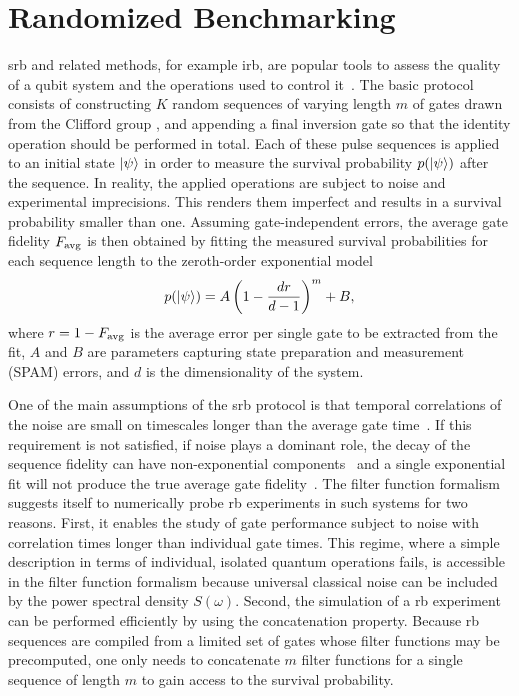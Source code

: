 \section{Randomized Benchmarking}\label{sec:ff:examples:randomized_benchmarking}
\Gls{srb} and related methods, for example \gls{irb}, are popular tools to assess the quality of a qubit system and the operations used to control it~\cite{Knill2008,Magesan2011,Magesan2012a}.
The basic protocol consists of constructing $K$ random sequences of varying length $m$ of gates drawn from the Clifford group
,
and appending a final inversion gate so that the identity operation should be performed in total.
Each of these pulse sequences is applied to an initial state $\mbox{\ensuremath{\ket{\psi}}}$ in order to measure the survival probability $p(\mbox{\ensuremath{\ket{\psi}}})$ after the sequence.
In reality, the applied operations are subject to noise and experimental imprecisions.
This renders them imperfect and results in a survival probability smaller than one.
Assuming gate-independent errors, the average gate fidelity $F_{\mathrm{avg}}$ is then obtained by fitting the measured survival probabilities for each sequence length to the zeroth-order exponential model~\cite{Magesan2011}
\begin{equation}\label{eq:ff:SRB}
    p(\mbox{\ensuremath{\ket{\psi}}}) = A \left(1 - \frac{dr}{d-1}\right)^m + B,
\end{equation}
where $r = 1 - F_{\mathrm{avg}}$ is the average error per single gate to be extracted from the fit, $A$ and $B$ are parameters capturing state preparation and measurement (SPAM) errors, and $d$ is the dimensionality of the system.

One of the main assumptions of the \gls{srb} protocol is that temporal correlations of the noise are small on timescales longer than the average gate time~\cite{Magesan2011}.
If this requirement is not satisfied, \eg if \oneoverf noise plays a dominant role, the decay of the sequence fidelity can have non-exponential components~\cite{Epstein2014,Fogarty2015,Feng2016} and a single exponential fit will not produce the true average gate fidelity~\cite{Mavadia2018,Edmunds2020}.
The filter function formalism suggests itself to numerically probe \gls{rb} experiments in such systems for two reasons.
First, it enables the study of gate performance subject to noise with correlation times longer than individual gate times.
This regime, where a simple description in terms of individual, isolated quantum operations fails, is accessible in the filter function formalism because universal classical noise can be included by the power spectral density $S(\omega)$.
Second, the simulation of a \gls{rb} experiment can be performed efficiently by using the concatenation property.
Because \gls{rb} sequences are compiled from a limited set of gates whose filter functions may be precomputed, one only needs to concatenate $m$ filter functions for a single sequence of length $m$ to gain access to the survival probability.

